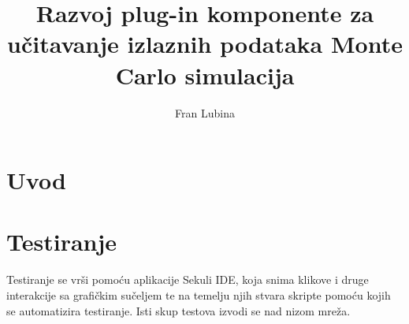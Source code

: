 \documentclass[times, utf8, zavrsni]{fer}
\begin{document}

\title{Razvoj plug-in komponente za učitavanje izlaznih podataka Monte Carlo simulacija}


\author{Fran Lubina}

\maketitle

\izvornik


\tableofcontents

\chapter{Uvod}

\chapter{Testiranje}
Testiranje se vrši pomoću aplikacije Sekuli IDE, koja snima klikove i druge interakcije sa grafičkim sučeljem te na temelju njih stvara skripte pomoću kojih se automatizira testiranje.
Isti skup testova izvodi se nad nizom mreža.
	
\end{document}
